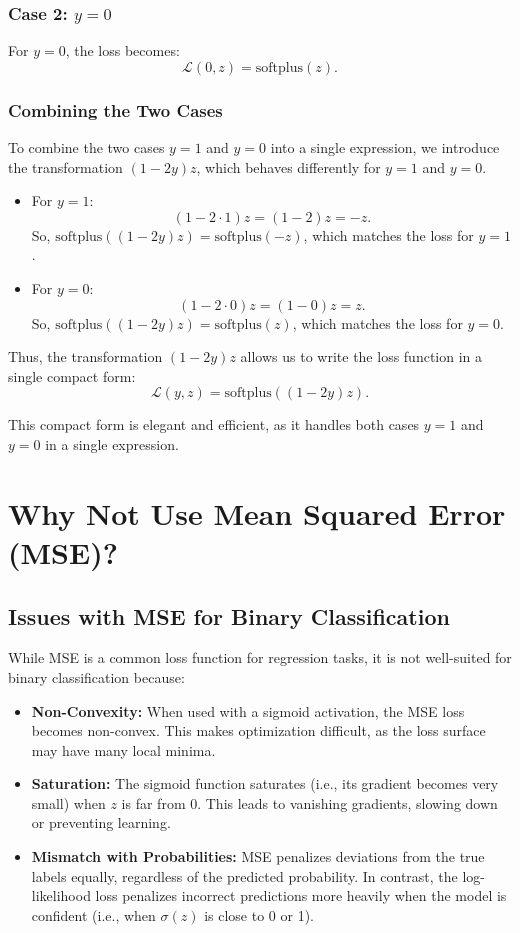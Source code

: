 \begin{notechapter}
\subsubsection{Case 2: \( y = 0 \)}
For \( y = 0 \), the loss becomes:
\[
\mathcal{L}(0, z) = \text{softplus}(z).
\]

\subsubsection{Combining the Two Cases}
To combine the two cases \( y = 1 \) and \( y = 0 \) into a single expression, we introduce the transformation \( (1 - 2y)z \), which behaves differently for \( y = 1 \) and \( y = 0 \).

\begin{itemize}
    \item For \( y = 1 \):
      \[
      (1 - 2 \cdot 1)z = (1 - 2)z = -z.
      \]
      So, \( \text{softplus}((1 - 2y)z) = \text{softplus}(-z) \), which matches the loss for \( y = 1 \).

    \item For \( y = 0 \):
      \[
      (1 - 2 \cdot 0)z = (1 - 0)z = z.
      \]
      So, \( \text{softplus}((1 - 2y)z) = \text{softplus}(z) \), which matches the loss for \( y = 0 \).
\end{itemize}

Thus, the transformation \( (1 - 2y)z \) allows us to write the loss function in a single compact form:
\[
\mathcal{L}(y, z) = \text{softplus}((1 - 2y)z).
\]

This compact form is elegant and efficient, as it handles both cases \( y = 1 \) and \( y = 0 \) in a single expression.

\section{Why Not Use Mean Squared Error (MSE)?}

\subsection{Issues with MSE for Binary Classification}
While MSE is a common loss function for regression tasks, it is not well-suited for binary classification because:
\begin{itemize}
    \item \textbf{Non-Convexity:} When used with a sigmoid activation, the MSE loss becomes non-convex. This makes optimization difficult, as the loss surface may have many local minima.
    \item \textbf{Saturation:} The sigmoid function saturates (i.e., its gradient becomes very small) when \( z \) is far from 0. This leads to vanishing gradients, slowing down or preventing learning.
    \item \textbf{Mismatch with Probabilities:} MSE penalizes deviations from the true labels equally, regardless of the predicted probability. In contrast, the log-likelihood loss penalizes incorrect predictions more heavily when the model is confident (i.e., when \( \sigma(z) \) is close to 0 or 1).
\end{itemize}


\end{notechapter}
